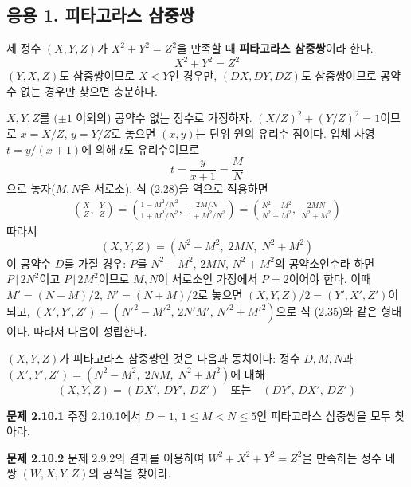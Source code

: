 \documentclass{article}
\begin{document}
\subsection*{응용 1. 피타고라스 삼중쌍}

세 정수 $(X,Y,Z)$가 $X^2+Y^2=Z^2$을 만족할 때 \textbf{피타고라스 삼중쌍}이라 한다.
\begin{equation}
  X^2 + Y^2 = Z^2 \tag{2.29}
\end{equation}
$(Y,X,Z)$도 삼중쌍이므로 $X<Y$인 경우만, $(DX,DY,DZ)$도 삼중쌍이므로 공약수 없는 경우만 찾으면 충분하다.

$X,Y,Z$를 $(\pm1$ 이외의) 공약수 없는 정수로 가정하자.
$(X/Z)^2+(Y/Z)^2=1$이므로 $x=X/Z$, $y=Y/Z$로 놓으면 $(x,y)$는 단위 원의 유리수 점이다.
입체 사영 $t = y/(x+1)$에 의해 $t$도 유리수이므로
\begin{equation}
  t = \frac{y}{x+1} = \frac{M}{N} \tag{2.33}
\end{equation}
으로 놓자($M,N$은 서로소). 식 (2.28)을 역으로 적용하면
\begin{align}
  \left(\frac{X}{Z},\;\frac{Y}{Z}\right)
  = \left(\frac{1-M^2/N^2}{1+M^2/N^2},\;\frac{2M/N}{1+M^2/N^2}\right)
  = \left(\frac{N^2-M^2}{N^2+M^2},\;\frac{2MN}{N^2+M^2}\right) \tag{2.34}
\end{align}
따라서
\begin{equation}
  (X,Y,Z) = (N^2-M^2,\;2MN,\;N^2+M^2) \tag{2.35}
\end{equation}
이 공약수 $D$를 가질 경우: $P$를 $N^2-M^2$, $2MN$, $N^2+M^2$의 공약소인수라 하면
$P\,|\,2N^2$이고 $P\,|\,2M^2$이므로 $M,N$이 서로소인 가정에서 $P=2$이어야 한다.
이때 $M'=(N-M)/2$, $N'=(N+M)/2$로 놓으면 $(X,Y,Z)/2 = (Y',X',Z')$이 되고,
$(X',Y',Z')=(N'^2-M'^2,\,2N'M',\,N'^2+M'^2)$으로 식 (2.35)와 같은 형태이다.
따라서 다음이 성립한다.

\begin{tcolorbox}[
  colback=red!4, colframe=red!60!black,
  title=주장 2.10.1,
  fonttitle=\bfseries, boxrule=0.5mm, arc=3mm]

$(X,Y,Z)$가 피타고라스 삼중쌍인 것은 다음과 동치이다:
정수 $D,M,N$과 $(X',Y',Z')=(N^2-M^2,\;2NM,\;N^2+M^2)$에 대해
\[
  (X,Y,Z) = (DX',\,DY',\,DZ')\quad\text{또는}\quad (DY',\,DX',\,DZ')
\]

\end{tcolorbox}

\medskip
\textbf{문제 2.10.1}\quad
주장 2.10.1에서 $D=1$, $1\le M<N\le 5$인 피타고라스 삼중쌍을 모두 찾아라.

\textbf{문제 2.10.2}\quad
문제 2.9.2의 결과를 이용하여 $W^2+X^2+Y^2=Z^2$을 만족하는 정수 네 쌍 $(W,X,Y,Z)$의 공식을 찾아라.
\end{document}
